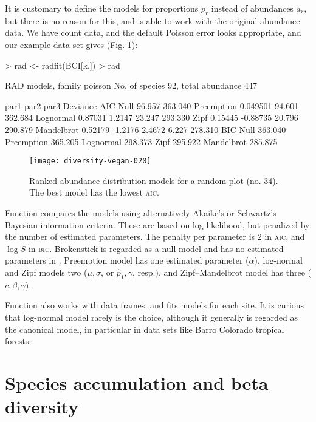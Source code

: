 \documentclass[a4paper,10pt,twocolumn]{article}
\begin{document}
It is customary to define the models for proportions $p_r$ instead of
abundances $a_r$, but there is no reason for this, and 
is able to work with the original abundance data.  We have count data,
and the default Poisson error looks appropriate, and our example data
set gives (Fig. \ref{fig:rad}):
\begin{Schunk}
\begin{Sinput}
> rad <- radfit(BCI[k,])
> rad
\end{Sinput}
\begin{Soutput}
RAD models, family poisson 
No. of species 92, total abundance 447

           par1      par2     par3    Deviance AIC    
Null                                   96.957  363.040
Preemption  0.049501                   94.601  362.684
Lognormal   0.87031   1.2147           23.247  293.330
Zipf        0.15445  -0.88735          20.796  290.879
Mandelbrot  0.52179  -1.2176   2.4672   6.227  278.310
           BIC    
Null       363.040
Preemption 365.205
Lognormal  298.373
Zipf       295.922
Mandelbrot 285.875
\end{Soutput}
\end{Schunk}
\begin{figure}
\texttt{[image: diversity-vegan-020]}
\caption{Ranked abundance distribution models for a random plot
  (no. 34).  The best model has the lowest \textsc{aic}.}
\label{fig:rad}
\end{figure}

Function  compares the models using alternatively
Akaike's or Schwartz's Bayesian information criteria.  These are based
on log-likelihood, but penalized by the number of estimated
parameters.  The penalty per parameter is $2$ in \textsc{aic}, and
$\log S$ in \textsc{bic}.  Brokenstick is regarded as a null model and
has no estimated parameters in .  Preemption model has
one estimated parameter ($\alpha$), log-normal and Zipf models two
($\mu, \sigma$, or $\hat p_1, \gamma$, resp.), and Zipf--Mandelbrot
model has three ($c, \beta, \gamma$).

Function  also works with data frames, and fits models
for each site. It is curious that log-normal model rarely is the
choice, although it generally is regarded as the canonical model, in
particular in data sets like Barro Colorado tropical forests.

\section{Species accumulation and beta diversity}
\end{document}
